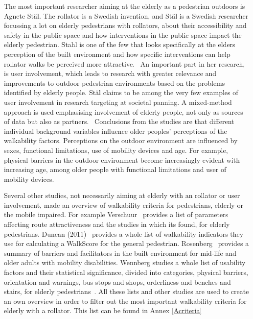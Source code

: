 The most important researcher aiming at the elderly as a pedestrian outdoors is Agnete St\"al. The rollator is a Swedish invention, and St\"al is a Swedish researcher focussing a lot on elderly pedestrians with rollators, about their accessibility and safety in the public space and how interventions in the public space impact the elderly pedestrian. Stahl is one of the few that looks specifically at the elders perception of the built environment and how specific interventions can help rollator walks be perceived more attractive.~\cite{Stahl2008, Stahl2013} An important part in her research, is user involvement, which leads to research with greater relevance and improvements to outdoor pedestrian environments based on the problems identified by elderly people. St\"al claims to be among the very few examples of user involvement in research targeting at societal panning. A mixed-method approach is used emphasising involvement of elderly people, not only as sources of data but also as partners.~\cite{Stahl2008} Conclusions from the studies are that different individual background variables influence older peoples' perceptions of the walkability factors. Perceptions on the outdoor environment are influenced by sexes, functional limitations, use of mobility devices and age. For example, physical barriers in the outdoor environment become increasingly evident with increasing age, among older people with functional limitations and user of mobility devices.~\cite{Stahl2013, Wennberg2009}



Several other studies, not necessarily aiming at elderly with an rollator or user involvement, made an overview of walkability criteria for pedestrians, elderly or the mobile impaired. For example Verschuur~\cite{Verschuur2013} provides a list of parameters affecting route attractiveness and the studies in which its found, for elderly pedestrians. Duncan (2011)~\cite{Duncan2011} provides a whole list of walkability indicators they use for calculating a WalkScore for the general pedestrian. Rosenberg~\cite{Rosenberg2013} provides a summary of barriers and facilitators in the built environment for mid-life and older adults with mobility disabilities. Wennberg studies a whole list of usability factors and their statistical significance, divided into categories, physical barriers, orientation and warnings, bus stops and shops, orderliness and benches and stairs, for elderly pedestrians~\cite{Wennberg2009}. All these lists and other studies are used to create an own overview in order to filter out the most important walkability criteria for elderly with a rollator. This list can be found in Annex \ref{Acriteria}

